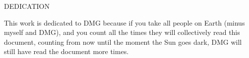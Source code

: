 \newpage
{}

\begin{center}
DEDICATION
\end{center}

\begin{center}
This work is dedicated to DMG because if
you take all people on Earth (minus myself
and DMG), and you count all the times they
will collectively read this document, counting
from now until the moment the Sun goes dark,
DMG will still have read the document more
times.
\end{center}
